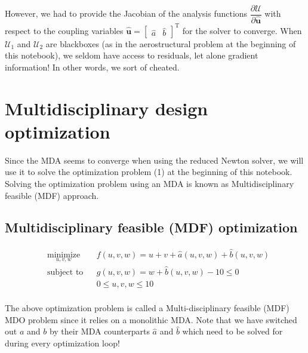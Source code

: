 \documentclass[11pt]{article}
\begin{document}
However, we had to provide the Jacobian of the analysis functions
\(\dfrac{\partial\mathcal{U}}{\partial\hat{\mathbf{u}}}\) with respect
to the coupling variables
\(\hat{\mathbf{u}} = \begin{bmatrix} \hat{a} & \hat{b} \end{bmatrix}^\mathrm{T}\)
for the solver to converge. When \(\mathcal{U}_1\) and \(\mathcal{U}_2\)
are blackboxes (as in the aerostructural problem at the beginning of
this notebook), we seldom have access to residuals, let alone gradient
information! In other words, we sort of cheated.

    \hypertarget{multidisciplinary-design-optimization}{%
\section{Multidisciplinary design
optimization}\label{multidisciplinary-design-optimization}}

Since the MDA seems to converge when using the reduced Newton solver, we
will use it to solve the optimization problem (1) at the beginning of
this notebook. Solving the optimization problem using an MDA is known as
Multidisciplinary feasible (MDF) approach.

\hypertarget{multidisciplinary-feasible-mdf-optimization}{%
\subsection{Multidisciplinary feasible (MDF)
optimization}\label{multidisciplinary-feasible-mdf-optimization}}

\begin{equation*}
    \begin{aligned}
        & \underset{u,v,w}{\text{minimize}}
        & & f(u,v,w) = u+v+\hat{a}(u,v,w)+\hat{b}(u,v,w)\\
        & \text{subject to}
        & & g(u,v,w) = w + \hat{b}(u,v,w) -10 \leq 0\\
        & & & 0 \leq u,v,w \leq 10\\
    \end{aligned}
    \tag{5}
\end{equation*}

The above optimization problem is called a Multi-disciplinary feasible
(MDF) MDO problem since it relies on a monolithic MDA. Note that we have
switched out \(a\) and \(b\) by their MDA counterparts \(\hat{a}\) and
\(\hat{b}\) which need to be solved for during every optimization loop!
\end{document}
